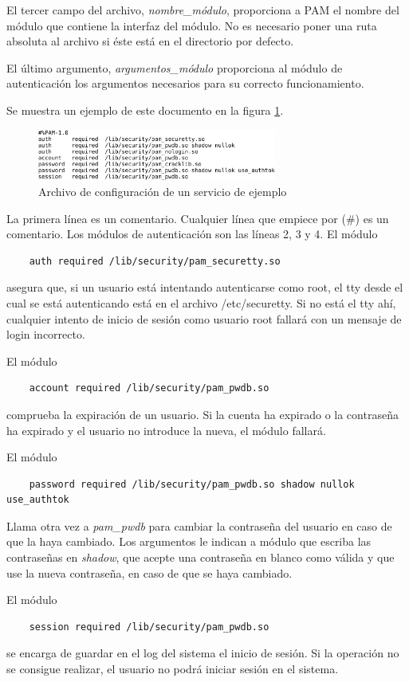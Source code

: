 \documentclass[titlepage, 12pt, a4paper]{article}
\begin{document}
El tercer campo del archivo, \textit{nombre\_módulo}, proporciona a PAM el nombre del módulo que contiene la interfaz del módulo. No es necesario poner una ruta absoluta al archivo si éste está en el directorio por defecto. \par
El último argumento, \textit{argumentos\_módulo} proporciona al módulo de autenticación los argumentos necesarios para su correcto funcionamiento. \par
Se muestra un ejemplo de este documento en la figura \ref{fig:archivoServicio}.
\begin{figure}[H]
    \centering
    \includegraphics[width=0.7\textwidth]{Media/PAMConfigFile.png}
    \caption{Archivo de configuración de un servicio de ejemplo}
    \label{fig:archivoServicio}
\end{figure}
La primera línea es un comentario. Cualquier línea que empiece por (\#) es un comentario. Los módulos de autenticación son las líneas 2, 3 y 4. El módulo
\begin{lstlisting}
	auth required /lib/security/pam_securetty.so
\end{lstlisting}
asegura que, si un usuario está intentando autenticarse como root, el \gls{tty} desde el cual se está autenticando está en el archivo /etc/securetty. Si no está el \gls{tty} ahí, cualquier intento de inicio de sesión como usuario \gls{root} fallará con un mensaje de login incorrecto. \par
El módulo 
\begin{lstlisting}
	account required /lib/security/pam_pwdb.so
\end{lstlisting}
comprueba la expiración de un usuario. Si la cuenta ha expirado o la contraseña ha expirado y el usuario no introduce la nueva, el módulo fallará. \par
El módulo 
\begin{lstlisting}
	password required /lib/security/pam_pwdb.so shadow nullok use_authtok
\end{lstlisting}
Llama otra vez a \textit{pam\_pwdb} para cambiar la contraseña del usuario en caso de que la haya cambiado. Los argumentos le indican a módulo que escriba las contraseñas en \textit{shadow}, que acepte una contraseña en blanco como válida y que use la nueva contraseña, en caso de que se haya cambiado. \par
El módulo
\begin{lstlisting}
	session required /lib/security/pam_pwdb.so
\end{lstlisting}
se encarga de guardar en el log del sistema el inicio de sesión. Si la operación no se consigue realizar, el usuario no podrá iniciar sesión en el sistema.
\end{document}
